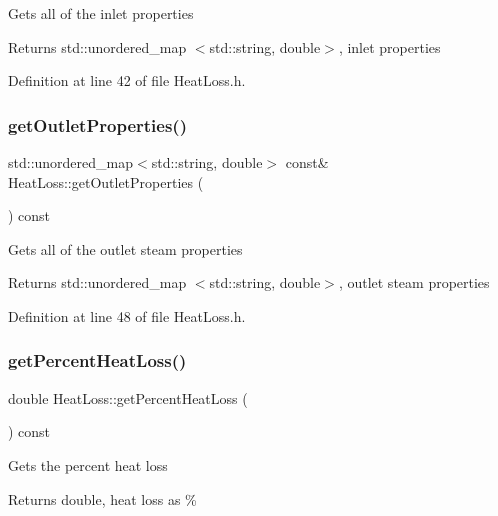 Gets all of the inlet properties \begin{DoxyReturn}{Returns}
std\+::unordered\+\_\+map $<$std\+::string, double$>$, inlet properties 
\end{DoxyReturn}


Definition at line 42 of file Heat\+Loss.\+h.

\mbox{\label{class_heat_loss_adddb2b3d6bff26a377219901381919f3}} 
\subsubsection{\texorpdfstring{get\+Outlet\+Properties()}{getOutletProperties()}}
{\footnotesize\ttfamily std\+::unordered\+\_\+map$<$std\+::string, double$>$ const\& Heat\+Loss\+::get\+Outlet\+Properties (\begin{DoxyParamCaption}{ }\end{DoxyParamCaption}) const\hspace{0.3cm}{\ttfamily [inline]}}

Gets all of the outlet steam properties \begin{DoxyReturn}{Returns}
std\+::unordered\+\_\+map $<$std\+::string, double$>$, outlet steam properties 
\end{DoxyReturn}


Definition at line 48 of file Heat\+Loss.\+h.

\mbox{\label{class_heat_loss_acbbf01db5cde157057e4d766cab22382}} 
\subsubsection{\texorpdfstring{get\+Percent\+Heat\+Loss()}{getPercentHeatLoss()}}
{\footnotesize\ttfamily double Heat\+Loss\+::get\+Percent\+Heat\+Loss (\begin{DoxyParamCaption}{ }\end{DoxyParamCaption}) const\hspace{0.3cm}{\ttfamily [inline]}}

Gets the percent heat loss \begin{DoxyReturn}{Returns}
double, heat loss as \% 
\end{DoxyReturn}


